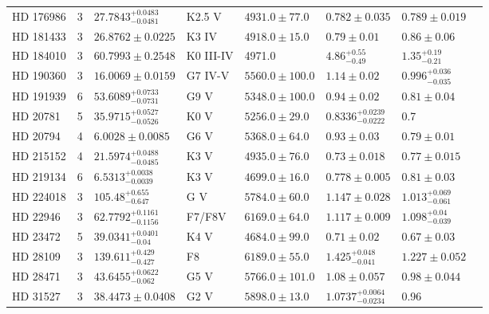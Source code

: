 \begin{tabular}{lrllllll}
HD 176986 & 3 & $27.7843^{+0.0483}_{-0.0481}$ & K2.5 V & $4931.0 \pm 77.0$ & $0.782 \pm 0.035$ & $0.789 \pm 0.019$ & \cite{NARI_ET_AL_2026} \\
HD 181433 & 3 & $26.8762 \pm 0.0225$ & K3 IV & $4918.0 \pm 15.0$ & $0.79 \pm 0.01$ & $0.86 \pm 0.06$ & \cite{STASSUN_ET_AL__2017} \\
HD 184010 & 3 & $60.7993 \pm 0.2548$ & K0 III-IV & 4971.0 & $4.86^{+0.55}_{-0.49}$ & $1.35^{+0.19}_{-0.21}$ & \cite{TENG_ET_AL_2022} \\
HD 190360 & 3 & $16.0069 \pm 0.0159$ & G7 IV-V & $5560.0 \pm 100.0$ & $1.14 \pm 0.02$ & $0.996^{+0.036}_{-0.035}$ & \cite{GIOVINAZZI_ET_AL_2026} \\
HD 191939 & 6 & $53.6089^{+0.0733}_{-0.0731}$ & G9 V & $5348.0 \pm 100.0$ & $0.94 \pm 0.02$ & $0.81 \pm 0.04$ & \cite{LUBIN_ET_AL__2024} \\
HD 20781 & 5 & $35.9715^{+0.0527}_{-0.0526}$ & K0 V & $5256.0 \pm 29.0$ & $0.8336^{+0.0239}_{-0.0222}$ & 0.7 & \cite{UDRY_ET_AL__2019} \\
HD 20794 & 4 & $6.0028 \pm 0.0085$ & G6 V & $5368.0 \pm 64.0$ & $0.93 \pm 0.03$ & $0.79 \pm 0.01$ & \cite{NARI_ET_AL_2025} \\
HD 215152 & 4 & $21.5974^{+0.0488}_{-0.0485}$ & K3 V & $4935.0 \pm 76.0$ & $0.73 \pm 0.018$ & $0.77 \pm 0.015$ & \cite{DELISLE_ET_AL__2018} \\
HD 219134 & 6 & $6.5313^{+0.0038}_{-0.0039}$ & K3 V & $4699.0 \pm 16.0$ & $0.778 \pm 0.005$ & $0.81 \pm 0.03$ & \cite{GILLON_ET_AL__2017} \\
HD 224018 & 3 & $105.48^{+0.655}_{-0.647}$ & G V & $5784.0 \pm 60.0$ & $1.147 \pm 0.028$ & $1.013^{+0.069}_{-0.061}$ & \cite{DAMASSO_ET_AL_2025} \\
HD 22946 & 3 & $62.7792^{+0.1161}_{-0.1156}$ & F7/F8V & $6169.0 \pm 64.0$ & $1.117 \pm 0.009$ & $1.098^{+0.04}_{-0.039}$ & \cite{GARAI_ET_AL__2023} \\
HD 23472 & 5 & $39.0341^{+0.0401}_{-0.04}$ & K4 V & $4684.0 \pm 99.0$ & $0.71 \pm 0.02$ & $0.67 \pm 0.03$ & \cite{BARROS_ET_AL_2022} \\
HD 28109 & 3 & $139.611^{+0.429}_{-0.427}$ & F8 & $6189.0 \pm 55.0$ & $1.425^{+0.048}_{-0.041}$ & $1.227 \pm 0.052$ & \cite{BARONE_ET_AL_2025} \\
HD 28471 & 3 & $43.6455^{+0.0622}_{-0.062}$ & G5 V & $5766.0 \pm 101.0$ & $1.08 \pm 0.057$ & $0.98 \pm 0.044$ & \cite{STEVENSON_ET_AL_2025} \\
HD 31527 & 3 & $38.4473 \pm 0.0408$ & G2 V & $5898.0 \pm 13.0$ & $1.0737^{+0.0064}_{-0.0234}$ & 0.96 & \cite{UDRY_ET_AL__2019} \\

\end{tabular}
